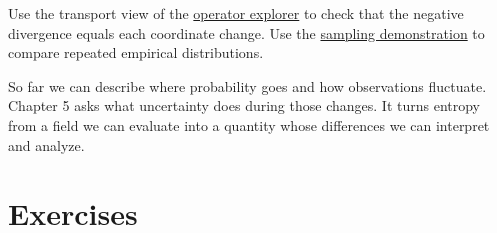 \documentclass[11pt,oneside,openany]{book}
\theoremstyle{definition}
\theoremstyle{remark}
\numberwithin{equation}{chapter}
\begin{document}
Use the transport view of the \href{https://bobovski66.github.io/IntroDiscreteInfoGeom/demos/operator-explorer.html}{operator explorer} to check that the negative divergence equals each coordinate change. Use the \href{https://bobovski66.github.io/IntroDiscreteInfoGeom/demos/week04.html}{sampling demonstration} to compare repeated empirical distributions.

So far we can describe where probability goes and how observations fluctuate. Chapter 5 asks what uncertainty does during those changes. It turns entropy from a field we can evaluate into a quantity whose differences we can interpret and analyze.

\section{Exercises}\label{ch04-exercises}
\end{document}
